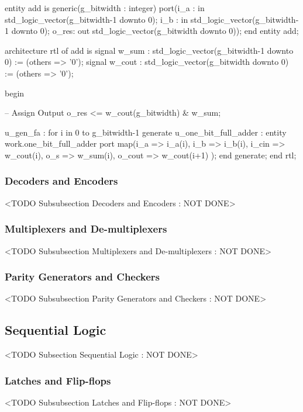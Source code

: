 \begin{VHDLlisting}[tabsize=8]
entity add is
generic(g_bitwidth : integer)
port(i_a  : in    std_logic_vector(g_bitwidth-1 downto 0);  
     i_b  : in    std_logic_vector(g_bitwidth-1 downto 0);  
	 o_res:   out std_logic_vector(g_bitwidth downto 0));
end entity add;

architecture rtl of add is 
	signal w_sum  : std_logic_vector(g_bitwidth-1 downto 0) := (others => '0'); 
	signal w_cout : std_logic_vector(g_bitwidth downto 0) := (others => '0');
	
begin 

	-- Assign Output 
	o_res <= w_cout(g_bitwidth) & w_sum; 
	
	u_gen_fa : for i in 0 to g_bitwidth-1 generate  
		u_one_bit_full_adder : entity work.one_bit_full_adder  
		port map(i_a    => i_a(i),
				 i_b    => i_b(i),
				 i_cin  => w_cout(i),
				 o_s    => w_sum(i),
				 o_cout => w_cout(i+1)
        );  
	end generate;
end rtl;
\end{VHDLlisting}


	
\subsubsection{Decoders and Encoders}
	<TODO Subsubsection  Decoders and Encoders : NOT DONE>

\subsubsection{Multiplexers and De-multiplexers}
	<TODO Subsubsection  Multiplexers and De-multiplexers : NOT DONE>

\subsubsection{Parity Generators and Checkers}
	<TODO Subsubsection  Parity Generators and Checkers : NOT DONE>

\subsection{Sequential Logic}
	<TODO Subsection Sequential Logic : NOT DONE>
	
\subsubsection{Latches and Flip-flops}
	<TODO Subsubsection  Latches and Flip-flops : NOT DONE>

